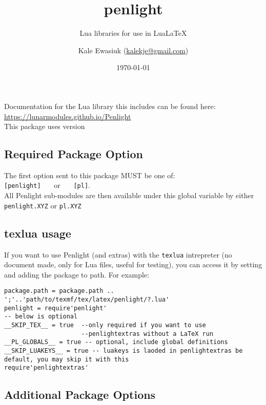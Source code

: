 \documentclass[11pt,parskip=half]{scrartcl}
\author{Kale Ewasiuk (\url{kalekje@gmail.com})}
\date{\today}
\title{penlight}
\subtitle{Lua libraries for use in LuaLaTeX}
\newcommand{\cmd}[1]{\texttt{\detokenize{#1}}}
\begin{document}

\maketitle

        Documentation for the Lua library this includes can be found here:\\
  \mbox{\url{https://lunarmodules.github.io/Penlight}}
    \\ This package uses version \cmd{1.13.1}

    \subsection*{Required Package Option}
    The first option sent to this package MUST be one of: \\
    \texttt{[penlight]} \ \ \  or \ \ \  \texttt{[pl]}.\\
    All Penlight sub-modules are then available under this global variable by either\\
    \texttt{penlight.XYZ} or \texttt{pl.XYZ}


  
  \subsection*{texlua usage}
If you want to use Penlight (and extras) with the \texttt{texlua} intrepreter (no document made, only for Lua files, useful for testing),
you can access it by setting \cmd{__SKIP_TEX__ = true} and adding the package to path. For example:
 \begin{verbatim}
package.path = package.path .. ';'..'path/to/texmf/tex/latex/penlight/?.lua'
penlight = require'penlight'
-- below is optional
__SKIP_TEX__ = true  --only required if you want to use
                     --penlightextras without a LaTeX run
__PL_GLOBALS__ = true -- optional, include global definitions
__SKIP_LUAKEYS__ = true -- luakeys is laoded in penlightextras be default, you may skip it with this
require'penlightextras'
\end{verbatim}

\pagebreak


\subsection*{Additional Package Options}
\end{document}

